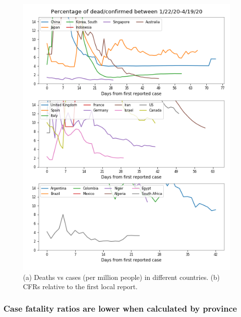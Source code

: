 \documentclass[8pt]{article}
\begin{document}
\begin{figure}[h]
\begin{minipage}{0.5\textwidth}
    \includegraphics[width=\textwidth]{figures/tsam_Covid19_JHU_cfr_fromFirstLocalCase.png}
    \end{minipage}
    \caption{(a) Deaths vs cases (per million people) in different countries. (b) CFRs relative to the first local report.}
    \label{fig:casesDeaths1000}
\end{figure}

\subsubsection{Case fatality ratios are lower when calculated by province}
\end{document}
